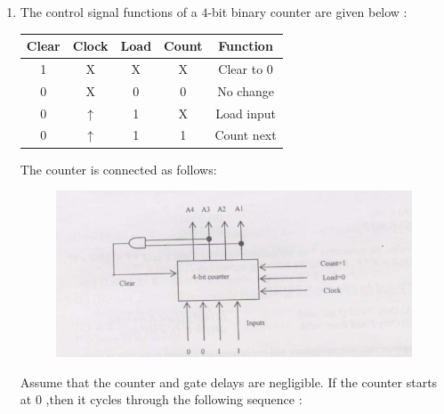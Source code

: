 \documentclass[journal,12pt,onecolumn]{IEEEtran}
\theoremstyle{remark}
\begin{document}
\begin {center}
\begin{enumerate}
\begin{enumerate}
\begin{multicols}{4}
            
        \end{multicols}
    \end{enumerate}
    \hfill \textbf{(GATE EE 2025)}
    \item The control signal functions of a $4$-bit binary counter are given below :
    \newline
         \begin{tabular}{|c|c|c|c|c|}
         
        \hline 
      Clear & Clock & Load & Count & Function \\ \hline 
      1 & X & X & X & Clear to $0$ \\ \hline
      0 & X & 0 & 0 & No change \\ \hline
      0 & $\uparrow$ & 1 & X & Load input \\ \hline
      0 & $\uparrow$ & 1 & 1 & Count next \\ \hline
          
             
        \end{tabular}
 
     
  
       
       
    
        The counter is connected as follows:
       
            \begin{figure}[h]
                \centering
                \includegraphics[width=0.9\linewidth]{figs/fig3.png}
                \caption{ }
                \label{fig3}
            \end{figure} 

            
          Assume that the counter and gate delays are negligible. If the counter starts at $0$ ,then it cycles through the following sequence :
            \begin{enumerate}
\end{enumerate}
\end{enumerate}
\end{center}
\end{document}
